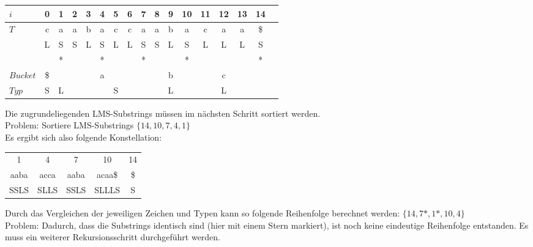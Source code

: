 \begin{center}
  \begin{tabular}{ | l | c | c | c | c | c | c | c | c | c | c | c | c | c | c | c | c | }
    \hline
        $i$ & 0 & 1 & 2 & 3 & 4 & 5 & 6 & 7 & 8 & 9 & 10 & 11 & 12 & 13 & 14 \\ \hline
        $T$ & c & a & a & b & a & c & c & a & a & b & a & c & a & a & \$ \\ \hline
            & L & S & S & L & S & L & L & S & S & L & S & L & L & L & S \\ \hline
            &   & * &   &   & * &   &   & * &   &   & * &   &   &   & * \\ \hline
   $Bucket$ &\$ & \multicolumn{7}{c}{a} &   & \multicolumn{1}{c}{b} &   & \multicolumn{3}{c}{c} & \\ \hline
      $Typ$ & S & \multicolumn{1}{c}{L} &   & \multicolumn{5}{c}{S} &   & \multicolumn{1}{c}{L} &    & \multicolumn{3}{c}{L} &\\
    \hline
  \end{tabular}
\end{center}
\bigskip

\noindent Die zugrundeliegenden LMS-Substrings müssen im nächsten Schritt sortiert werden. \\
\noindent Problem: Sortiere LMS-Substrings $\{14, 10, 7, 4, 1\}$ \\

\noindent Es ergibt sich also folgende Konstellation:

\begin{center}
	\begin{tabular}{c|c|c|c|c}
			 1 	     &            4          &          7            &           10            &          14 \\
          	aaba     &          acca         &        aaba           &          acaa\$         &          \$  \\
         	SSLS     &          SLLS         &        SSLS           &          SLLLS          &           S
	\end{tabular}
\end{center}
\bigskip

\noindent Durch das Vergleichen der jeweiligen Zeichen und Typen kann so folgende Reihenfolge berechnet werden: $\{14, 7*, 1*, 10, 4\}$ \\
\noindent Problem: Dadurch, dass die Substrings identisch sind (hier mit einem Stern markiert), ist noch keine eindeutige Reihenfolge entstanden. Es muss ein weiterer Rekursionsschritt durchgeführt werden.

